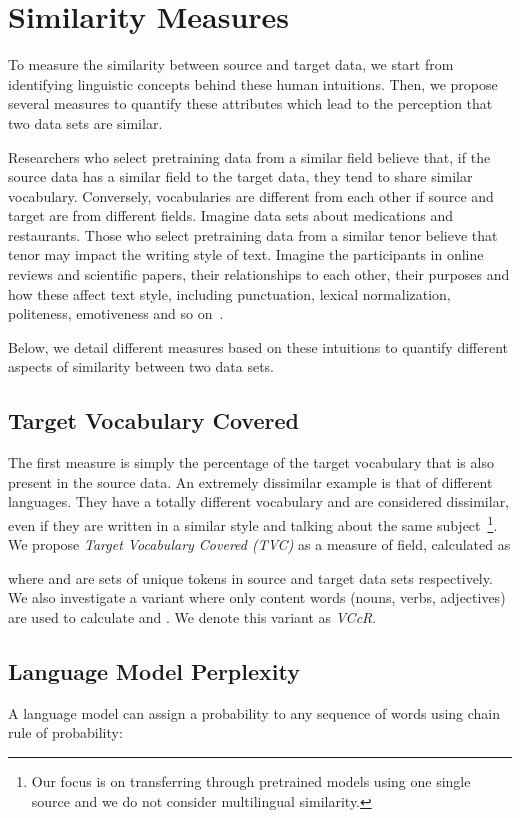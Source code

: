 \documentclass[11pt,a4paper]{article}
\begin{document}
\section{Similarity Measures}
To measure the similarity between source and target data, we start from identifying linguistic concepts behind these human intuitions. 
Then, we propose several measures to quantify these attributes which lead to the perception that two data sets are similar. 

Researchers who select pretraining data from a similar field believe that, if the source data has a similar field to the target data, they tend to share similar vocabulary. 
Conversely, vocabularies are different from each other if source and target are from different fields. 
Imagine data sets about medications and restaurants. 
Those who select pretraining data from a similar tenor believe that tenor may impact the writing style of text. 
Imagine the participants in online reviews and scientific papers, their relationships to each other, their purposes and how these affect text style, including punctuation, lexical normalization, politeness, emotiveness and so on~\citep{Lee:LLT:2001,Solano:TCR:2006,Pavlick:Tetreault:TACL:2016}.

Below, we detail different measures based on these intuitions to quantify different aspects of similarity between two data sets.

\subsection{Target Vocabulary Covered}
The first measure is simply the percentage of the target vocabulary that is also present in the source data.
An extremely dissimilar example is that of different languages. 
They have a totally different vocabulary and are considered dissimilar, even if they are written in a similar style and talking about the same subject~\footnote{Our focus is on transferring through pretrained models using one single source and we do not consider multilingual similarity.}.
We propose \emph{Target Vocabulary Covered (TVC)} as a measure of field, calculated as

where  and  are sets of unique tokens in source and target data sets respectively. 
We also investigate a variant where only content words (nouns, verbs, adjectives) are used to calculate  and . 
We denote this variant as \emph{VCcR}.

\subsection{Language Model Perplexity}
A language model can assign a probability to any sequence of words  using chain rule of probability:
\end{document}
